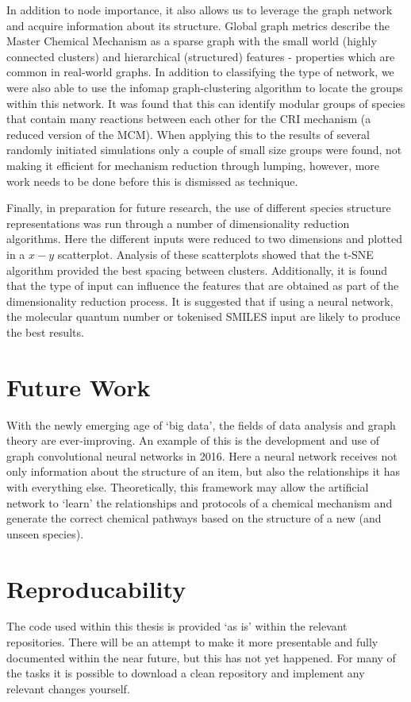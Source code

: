 In addition to node importance, it also allows us to leverage the graph network and acquire information about its structure. Global graph metrics describe the Master Chemical Mechanism as a sparse graph with the small world (highly connected clusters) and hierarchical (structured) features - properties which are common in real-world graphs. In addition to classifying the type of network, we were also able to use the infomap graph-clustering algorithm to locate the groups within this network. It was found that this can identify modular groups of species that contain many reactions between each other for the CRI mechanism (a reduced version of the MCM). When applying this to the results of several randomly initiated simulations only a couple of small size groups were found, not making it efficient for mechanism reduction through lumping, however, more work needs to be done before this is dismissed as technique.

Finally, in preparation for future research, the use of different species structure representations was run through a number of dimensionality reduction algorithms. Here the different inputs were reduced to two dimensions and plotted in a $x-y$ scatterplot. Analysis of these scatterplots showed that the t-SNE algorithm provided the best spacing between clusters. Additionally, it is found that the type of input can influence the features that are obtained as part of the dimensionality reduction process. It is suggested that if using a neural network, the molecular quantum number or tokenised SMILES input are likely to produce the best results.

\section{Future Work}
With the newly emerging age of `big data', the fields of data analysis and graph theory are ever-improving. An example of this is the development and use of graph convolutional neural networks in 2016. Here a neural network receives not only information about the structure of an item, but also the relationships it has with everything else. Theoretically, this framework may allow the artificial network to `learn' the relationships and protocols of a chemical mechanism and generate the correct chemical pathways based on the structure of a new (and unseen species).

\newpage

\section*{Reproducability}
The code used within this thesis is provided `as is' within the relevant repositories. There will be an attempt to make it more presentable and fully documented within the near future, but this has not yet happened. For many of the tasks it is possible to download a clean repository and implement any relevant changes yourself.

